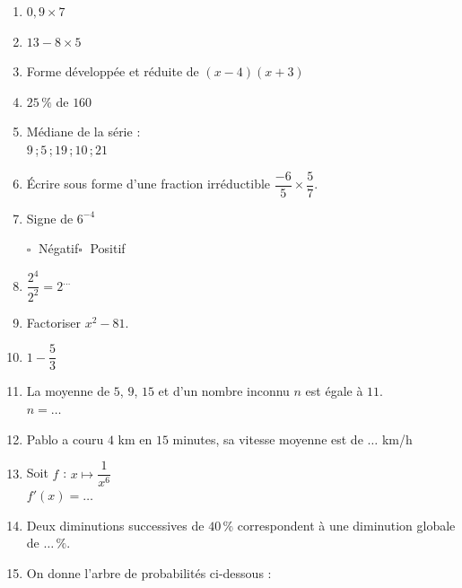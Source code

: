 \documentclass[a4paper,11pt,landscape,exos]{nsi} %
\begin{document}
\begin{multicols}{2}
\maketitle

\begin{enumerate}[itemsep=0.3cm]
    \item $0{,}9 \times 7$ 
	\item  $13-8\times5$
	\item Forme développée et réduite de $(x-4)(x+3)$
	\item $25\,\%$ de $160$
	\item Médiane de la série :\\$9$\,;\,$5$\,;\,$19$\,;\,$10$\,;\,$21$ 
	\item Écrire sous forme d'une fraction irréductible $\dfrac{-6}{5}\times \dfrac{5}{7}$.
	\item Signe de  $6^{-4}$ 
    
    	$\square\;$ Négatif\qquad $\square\;$ Positif\qquad 
	\item $\dfrac{2^{4}}{2^{2}}=2^{\ldots}$
	\item  Factoriser  $x^2-81$.
	\item $1-\dfrac{5}{3}$ 
	\item La moyenne de $5$, $9$, $15$ et d'un nombre inconnu $n$ est égale à $11$.\\$n=\ldots$
	\item Pablo a couru $4$ km en $15$ minutes, sa vitesse moyenne est de   $\ldots$ km/h
	\item Soit $f$ : $x\longmapsto \dfrac{1}{x^6}$\\$f'(x)=\ldots$
	\item Deux diminutions successives de  $40\,\%$ correspondent à une diminution globale de  $\ldots \,\%$.
    \item On donne l’arbre de probabilités ci-dessous :\\         \begin{tikzpicture}[baseline,scale = 0.5]


\end{tikzpicture}
\end{enumerate}
\end{multicols}
\end{document}
